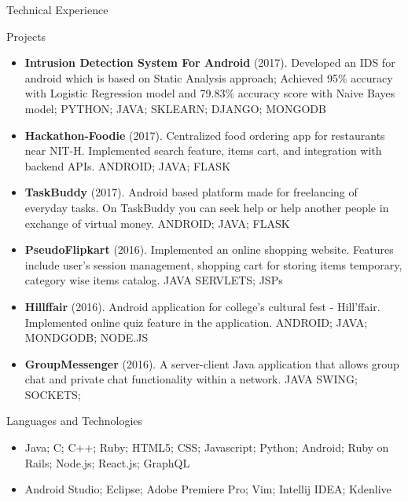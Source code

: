 \documentclass[]{mcdowellcv}
\begin{document}
	\begin{cvsection}{Technical Experience}
		\begin{cvsubsection}{Projects}{}{}
			\begin{itemize}
				\item \textbf{Intrusion Detection System For Android} (2017). Developed an IDS for android which is based on Static Analysis approach; Achieved 95\% accuracy with Logistic Regression model and 79.83\% accuracy score with Naive Bayes model; PYTHON; JAVA; SKLEARN; DJANGO; MONGODB
				\item \textbf{Hackathon-Foodie } (2017). Centralized food ordering app for restaurants near NIT-H. Implemented search feature, items cart, and integration with backend APIs. ANDROID; JAVA; FLASK
				\item \textbf{TaskBuddy } (2017). Android based platform made for freelancing of everyday tasks. On TaskBuddy you can seek help or help another people in exchange of virtual money. ANDROID; JAVA; FLASK	
				\item \textbf{PseudoFlipkart} (2016). Implemented an online shopping website. Features include user’s session management, shopping cart for storing items temporary, category wise items catalog. JAVA SERVLETS; JSPs
				\item \textbf{Hillffair} (2016). Android application for college’s cultural fest - Hill’ffair. Implemented online quiz feature in the application. ANDROID; JAVA; MONDGODB; NODE.JS
				\item \textbf{GroupMessenger} (2016). A server-client Java application that allows group chat and private chat functionality within a network. JAVA SWING; SOCKETS;
			\end{itemize}
		\end{cvsubsection}
	\end{cvsection}

	\begin{cvsection}{Languages and Technologies}
		\begin{cvsubsection}{}{}{}	
			\begin{itemize}
				\item Java; C; C++; Ruby; HTML5; CSS; Javascript; Python; Android; Ruby on Rails; Node.js; React.js; GraphQL
				\item Android Studio; Eclipse; Adobe Premiere Pro; Vim; Intellij IDEA; Kdenlive
			\end{itemize}
		\end{cvsubsection}
	\end{cvsection}
	
\end{document}
